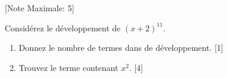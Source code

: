 \begin{question}
  \hspace*{\fill} [Note Maximale: 5]\par
  \medskip
  \noindent Considérez le développement de $(x + 2)^{11}$.\par
  \begin{enumerate}[label=(\alph*)]
    \item Donnez le nombre de termes dans de développement.\hspace*{\fill} [1]
    \item Trouvez le terme contenant $x^2$.\hspace*{\fill} [4]
   \end{enumerate}
\end{question}
